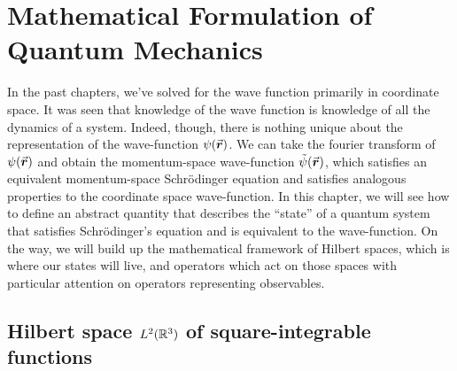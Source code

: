 \chapter{Mathematical Formulation of Quantum Mechanics}

In the past chapters, we've solved for the wave function primarily in coordinate space.
It was seen that knowledge of the wave function is knowledge of all the dynamics of a system.
Indeed, though, there is nothing unique about the representation of the wave-function $\psi(\va*{r})$.
We can take the fourier transform of $\psi(\va*{r})$ and obtain the momentum-space wave-function $\tilde{\psi}(\va*{r})$, which satisfies an equivalent momentum-space Schr\"{o}dinger equation and satisfies analogous properties to the coordinate space wave-function.
In this chapter, we will see how to define an abstract quantity that describes the ``state'' of a quantum system that satisfies Schr\"{o}dinger's equation and is equivalent to the wave-function.
On the way, we will build up the mathematical framework of Hilbert spaces, which is where our states will live, and operators which act on those spaces with particular attention on operators representing observables.

\section{Hilbert space $L^2(\mathbb{R}^3)$ of square-integrable functions}

